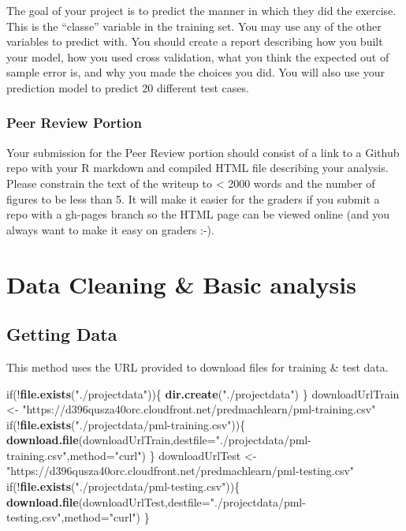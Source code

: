 \documentclass[]{article}
\newenvironment{Shaded}{\begin{snugshade}}{\end{snugshade}}
\newcommand{\KeywordTok}[1]{\textcolor[rgb]{0.13,0.29,0.53}{\textbf{{#1}}}}
\newcommand{\DataTypeTok}[1]{\textcolor[rgb]{0.13,0.29,0.53}{{#1}}}
\newcommand{\StringTok}[1]{\textcolor[rgb]{0.31,0.60,0.02}{{#1}}}
\newcommand{\NormalTok}[1]{{#1}}
\begin{document}
The goal of your project is to predict the manner in which they did the
exercise. This is the ``classe'' variable in the training set. You may
use any of the other variables to predict with. You should create a
report describing how you built your model, how you used cross
validation, what you think the expected out of sample error is, and why
you made the choices you did. You will also use your prediction model to
predict 20 different test cases.

\subsubsection{Peer Review Portion}\label{peer-review-portion}

Your submission for the Peer Review portion should consist of a link to
a Github repo with your R markdown and compiled HTML file describing
your analysis. Please constrain the text of the writeup to \textless{}
2000 words and the number of figures to be less than 5. It will make it
easier for the graders if you submit a repo with a gh-pages branch so
the HTML page can be viewed online (and you always want to make it easy
on graders :-).

\section{Data Cleaning \& Basic
analysis}\label{data-cleaning-basic-analysis}

\subsection{Getting Data}\label{getting-data}

This method uses the URL provided to download files for training \& test
data.

\begin{Shaded}
\begin{Highlighting}[]
\NormalTok{if(!}\KeywordTok{file.exists}\NormalTok{(}\StringTok{"./projectdata"}\NormalTok{))\{}
        \KeywordTok{dir.create}\NormalTok{(}\StringTok{"./projectdata"}\NormalTok{)}
\NormalTok{\}}
\NormalTok{downloadUrlTrain <-}\StringTok{ "https://d396qusza40orc.cloudfront.net/predmachlearn/pml-training.csv"}
\NormalTok{if(!}\KeywordTok{file.exists}\NormalTok{(}\StringTok{"./projectdata/pml-training.csv"}\NormalTok{))\{}
        \KeywordTok{download.file}\NormalTok{(downloadUrlTrain,}\DataTypeTok{destfile=}\StringTok{"./projectdata/pml-training.csv"}\NormalTok{,}\DataTypeTok{method=}\StringTok{"curl"}\NormalTok{)}
\NormalTok{\}}
\NormalTok{downloadUrlTest <-}\StringTok{ "https://d396qusza40orc.cloudfront.net/predmachlearn/pml-testing.csv"}
\NormalTok{if(!}\KeywordTok{file.exists}\NormalTok{(}\StringTok{"./projectdata/pml-testing.csv"}\NormalTok{))\{}
        \KeywordTok{download.file}\NormalTok{(downloadUrlTest,}\DataTypeTok{destfile=}\StringTok{"./projectdata/pml-testing.csv"}\NormalTok{,}\DataTypeTok{method=}\StringTok{"curl"}\NormalTok{)}
\NormalTok{\}}
\end{Highlighting}
\end{Shaded}
\end{document}
